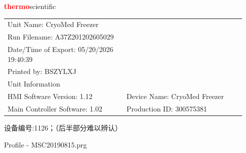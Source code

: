 \documentclass[UTF8,10pt,a4paper,fontset=fandol]{ctexart}
\newcommand{\handwritten}[1]{#1}
\begin{document}
\begin{flushright}
{\Large\textcolor{red}{\textbf{thermo}}scientific}
\end{flushright}

\begin{tabular}{@{}p{0.47\linewidth}p{0.47\linewidth}@{}}
Unit Name: CryoMed Freezer &
\\
Run Filename: A37Z201202605029 &
\\
Date/Time of Export: 05/20/2026 19:40:39 &
\\
Printed by: BSZYLXJ &
\\
Unit Information &
\\[0.15em]
\hspace{1em}HMI Software Version: 1.12 &
Device Name: CryoMed Freezer
\\
\hspace{1em}Main Controller Software: 1.02 &
Production ID: 300575381
\end{tabular}

\handwritten{设备编号:1126；（后半部分难以辨认）}

\vspace{0.4em}

\begin{center}
\end{center}

\begin{center}
\small Profile - MSC20190815.prg
\end{center}
\end{document}
